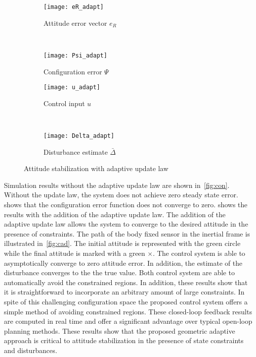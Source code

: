 \documentclass[letterpaper, 10 pt, conference]{ieeeconf}  %
\begin{document}
\begin{figure} 
	\centering 
	\begin{subfigure}[htbp]{0.5\columnwidth} 
		\texttt{[image: eR\_adapt]} 
		\caption{Attitude error vector \(e_R\) } \label{fig:eR_adapt} 
	\end{subfigure}~ %
	\begin{subfigure}[htbp]{0.5\columnwidth} 
		\texttt{[image: Psi\_adapt]} 
		\caption{Configuration error \( \Psi \)} \label{fig:Psi_adapt} 
	\end{subfigure}
	
	\begin{subfigure}[htbp]{0.5\columnwidth} 
		\texttt{[image: u\_adapt]} 
		\caption{Control input \( u\)} \label{fig:u_adapt} 
	\end{subfigure}~	
	\begin{subfigure}[htbp]{0.5\columnwidth} 
		\texttt{[image: Delta\_adapt]} 
		\caption{Disturbance estimate \( \bar{\Delta}\)} \label{fig:Delta_adapt} 
	\end{subfigure}
	\caption{Attitude stabilization with adaptive update law}
	\label{fig:adapt} 
\end{figure}

Simulation results without the adaptive update law are shown in~\cref{fig:con}.
Without the update law, the system does not achieve zero steady state error. 
 shows that the configuration error function does not converge to zero.
 shows the results with the addition of the adaptive update law.
The addition of the adaptive update law allows the system to converge to the desired attitude in the presence of constraints.
The path of the body fixed sensor in the inertial frame is illustrated in~\cref{fig:cad}.
The initial attitude is represented with the green circle while the final attitude is marked with a green \(\times\).
The control system is able to asymptotically converge to zero attitude error.
In addition, the estimate of the disturbance converges to the the true value.
Both control system are able to automatically avoid the constrained regions. 
In addition, these results show that it is straightforward to incorporate an arbitrary amount of large constraints.
In spite of this challenging configuration space the proposed control system offers a simple method of avoiding constrained regions.
These closed-loop feedback results are computed in real time and offer a significant advantage over typical open-loop planning methods.
These results show that the proposed geometric adaptive approach is critical to attitude stabilization in the presence of state constraints and disturbances.
\end{document}
